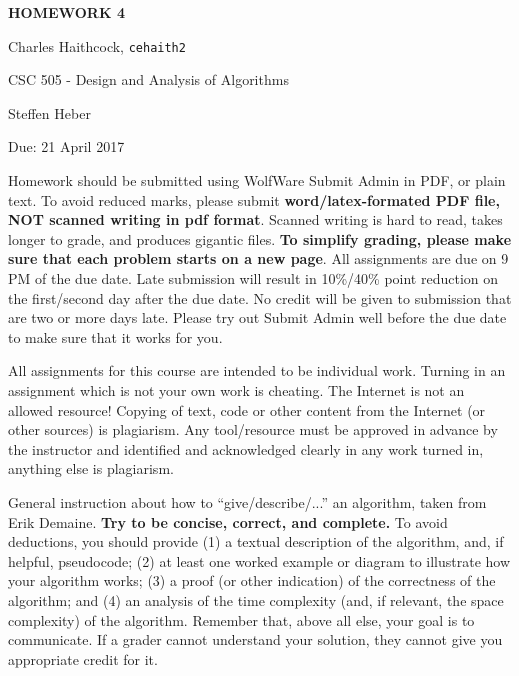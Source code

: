 \documentclass{article}
\newcommand{\homeworktitle}{\uppercase{Homework 4}}
\newcommand{\homeworkauthor}{Charles Haithcock}
\newcommand{\unityid}{cehaith2}
\newcommand{\duedate}{Due: 21 April 2017}
\newcommand{\coursetitle}{CSC 505 - Design and Analysis of Algorithms}
\newcommand{\instructor}{Steffen Heber}
\begin{document}
\begin{center}
    \huge\textbf{\homeworktitle}
\end{center}
\vspace{1cm}

\begin{center}
    \large\homeworkauthor, \texttt{\unityid}
\end{center}
\vspace{1cm}

\begin{center}
    \large\coursetitle 
    
    \instructor
\end{center}
\vspace{1cm}

\begin{center}
    \large\duedate
\end{center}
\vspace{1cm}

\newpage




Homework should be submitted using WolfWare Submit Admin in PDF, or plain text. 
To avoid reduced marks, please submit \textbf{word/latex-formated PDF file, NOT 
scanned writing in pdf format}. Scanned writing is hard to read, takes longer to
 grade, and produces gigantic files. \textbf{To simplify grading, please make 
sure that each problem starts on a new page}. All assignments are due on 9 PM of
the due date. Late submission will result in 10\%/40\% point reduction on the 
first/second day after the due date. No credit will be given to submission that 
are two or more days late. Please try out Submit Admin well before the due date 
to make sure that it works for you.

All assignments for this course are intended to be individual work. Turning in 
an assignment which is not your own work is cheating. The Internet is not an 
allowed resource! Copying of text, code or other content from the Internet (or 
other sources) is plagiarism. Any tool/resource must be approved in advance by 
the instructor and identified and acknowledged clearly in any work turned in, 
anything else is plagiarism.

General instruction about how to “give/describe/...” an algorithm, taken from 
Erik Demaine. \textbf{Try to be concise, correct, and complete.} To avoid 
deductions, you should provide (1) a textual description of the algorithm, and, 
if helpful, pseudocode; (2) at least one worked example or diagram to illustrate
how your algorithm works; (3) a proof (or other indication) of the correctness 
of the algorithm; and (4) an analysis of the time complexity (and, if relevant, 
the space complexity) of the algorithm. Remember that, above all else, your goal
is to communicate. If a grader cannot understand your solution, they cannot give
you appropriate credit for it.
\end{document}
